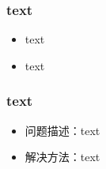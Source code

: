 \subsubsection{text}
\begin{itemize}
    \item text
    \item text
\end{itemize}



\subsubsection{text}
\begin{itemize}
    \item 问题描述：text
    \item 解决方法：text
\end{itemize}






